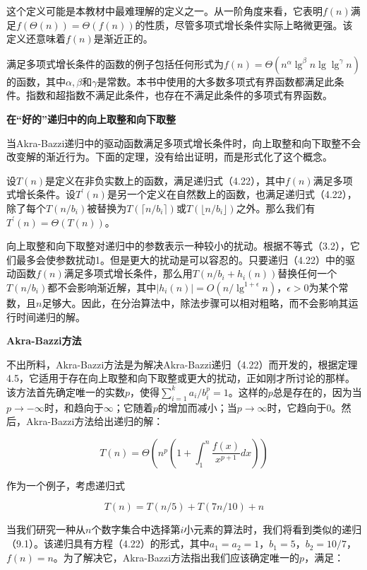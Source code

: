\documentclass[lang=cn,newtx,10pt,scheme=chinese]{elegantbook}
\begin{document}
这个定义可能是本教材中最难理解的定义之一。从一阶角度来看，它表明$f(n)$满足$f(\Theta(n))=\Theta(f(n))$的性质，尽管多项式增长条件实际上略微更强。该定义还意味着$f(n)$是渐近正的。

满足多项式增长条件的函数的例子包括任何形式为$f(n)=\Theta(n^\alpha \lg ^\beta n \lg \lg ^\gamma n)$的函数，其中$\alpha, \beta$和$\gamma$是常数。本书中使用的大多数多项式有界函数都满足此条件。指数和超指数不满足此条件，也存在不满足此条件的多项式有界函数。

\textbf{在``好的''递归中的向上取整和向下取整}

当Akra-Bazzi递归中的驱动函数满足多项式增长条件时，向上取整和向下取整不会改变解的渐近行为。下面的定理，没有给出证明，而是形式化了这个概念。

\begin{theorem}{}{}
设$T(n)$是定义在非负实数上的函数，满足递归式（4.22），其中$f(n)$满足多项式增长条件。设$T^{\prime}(n)$是另一个定义在自然数上的函数，也满足递归式（4.22），除了每个$T(n / b_i)$被替换为$T(\lceil n / b_i\rceil)$或$T(\lfloor n / b_i\rfloor)$之外。那么我们有$T^{\prime}(n)=\Theta(T(n))$。
\end{theorem}

向上取整和向下取整对递归中的参数表示一种较小的扰动。根据不等式（3.2），它们最多会使参数扰动1。但是更大的扰动是可以容忍的。只要递归（4.22）中的驱动函数$f(n)$满足多项式增长条件，那么用$T(n / b_i+h_i(n))$替换任何一个$T(n / b_i)$都不会影响渐近解，其中$|h_i(n)|=O(n / \lg ^{1+\epsilon} n)$，$\epsilon>0$为某个常数，且$n$足够大。因此，在分治算法中，除法步骤可以相对粗略，而不会影响其运行时间递归的解。

\textbf{Akra-Bazzi方法}

不出所料，Akra-Bazzi方法是为解决Akra-Bazzi递归（4.22）而开发的，根据定理4.5，它适用于存在向上取整和向下取整或更大的扰动，正如刚才所讨论的那样。该方法首先确定唯一的实数$p$，使得$\sum_{i=1}^k a_i / b_i^p=1$。这样的$p$总是存在的，因为当$p \rightarrow-\infty$时，和趋向于$\infty$；它随着$p$的增加而减小；当$p \rightarrow \infty$时，它趋向于0。然后，Akra-Bazzi方法给出递归的解：

\begin{equation}
T(n)=\Theta(n^p(1+\int_1^n \frac{f(x)}{x^{p+1}} d x))
\end{equation}

作为一个例子，考虑递归式

\begin{equation}
T(n)=T(n / 5)+T(7 n / 10)+n
\end{equation}

当我们研究一种从$n$个数字集合中选择第$i$小元素的算法时，我们将看到类似的递归（9.1）。该递归具有方程（4.22）的形式，其中$a_1=a_2=1$，$b_1=5$，$b_2=10/7$，$f(n)=n$。为了解决它，Akra-Bazzi方法指出我们应该确定唯一的$p$，满足：
\end{document}

